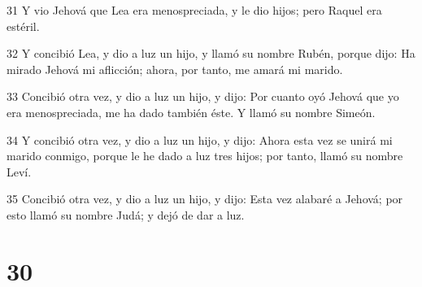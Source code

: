 \par 31 Y vio Jehová que Lea era menospreciada, y le dio hijos; pero Raquel era estéril.
\par 32 Y concibió Lea, y dio a luz un hijo, y llamó su nombre Rubén, porque dijo: Ha mirado Jehová mi aflicción; ahora, por tanto, me amará mi marido.
\par 33 Concibió otra vez, y dio a luz un hijo, y dijo: Por cuanto oyó Jehová que yo era menospreciada, me ha dado también éste. Y llamó su nombre Simeón.
\par 34 Y concibió otra vez, y dio a luz un hijo, y dijo: Ahora esta vez se unirá mi marido conmigo, porque le he dado a luz tres hijos; por tanto, llamó su nombre Leví.
\par 35 Concibió otra vez, y dio a luz un hijo, y dijo: Esta vez alabaré a Jehová; por esto llamó su nombre Judá; y dejó de dar a luz.

\chapter{30}

